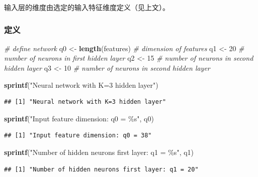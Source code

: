 \documentclass[
]{article}
\newenvironment{Shaded}{\begin{snugshade}}{\end{snugshade}}
\newcommand{\CommentTok}[1]{\textcolor[rgb]{0.56,0.35,0.01}{\textit{#1}}}
\newcommand{\DecValTok}[1]{\textcolor[rgb]{0.00,0.00,0.81}{#1}}
\newcommand{\FunctionTok}[1]{\textcolor[rgb]{0.13,0.29,0.53}{\textbf{#1}}}
\newcommand{\NormalTok}[1]{#1}
\newcommand{\OtherTok}[1]{\textcolor[rgb]{0.56,0.35,0.01}{#1}}
\newcommand{\StringTok}[1]{\textcolor[rgb]{0.31,0.60,0.02}{#1}}
\begin{document}
输入层的维度由选定的输入特征维度定义（见上文）。

\subsubsection{定义}\label{ux5b9aux4e49-2}

\begin{Shaded}
\begin{Highlighting}[]
\CommentTok{\# define network}
\NormalTok{q0 }\OtherTok{\textless{}{-}} \FunctionTok{length}\NormalTok{(features)   }\CommentTok{\# dimension of features}
\NormalTok{q1 }\OtherTok{\textless{}{-}} \DecValTok{20}                 \CommentTok{\# number of neurons in first hidden layer}
\NormalTok{q2 }\OtherTok{\textless{}{-}} \DecValTok{15}                 \CommentTok{\# number of neurons in second hidden layer}
\NormalTok{q3 }\OtherTok{\textless{}{-}} \DecValTok{10}                 \CommentTok{\# number of neurons in second hidden layer}

\FunctionTok{sprintf}\NormalTok{(}\StringTok{"Neural network with K=3 hidden layer"}\NormalTok{)}
\end{Highlighting}
\end{Shaded}

\begin{verbatim}
## [1] "Neural network with K=3 hidden layer"
\end{verbatim}

\begin{Shaded}
\begin{Highlighting}[]
\FunctionTok{sprintf}\NormalTok{(}\StringTok{"Input feature dimension: q0 = \%s"}\NormalTok{, q0)}
\end{Highlighting}
\end{Shaded}

\begin{verbatim}
## [1] "Input feature dimension: q0 = 38"
\end{verbatim}

\begin{Shaded}
\begin{Highlighting}[]
\FunctionTok{sprintf}\NormalTok{(}\StringTok{"Number of hidden neurons first layer: q1 = \%s"}\NormalTok{, q1)}
\end{Highlighting}
\end{Shaded}

\begin{verbatim}
## [1] "Number of hidden neurons first layer: q1 = 20"
\end{verbatim}
\end{document}
